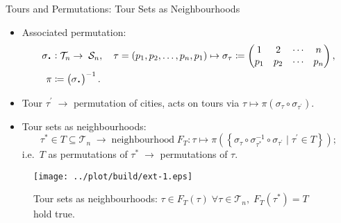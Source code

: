 \documentclass[
  size=8pt,
  style=klope,
  paper=screen,
  mode=present,
  nohandoutpagebreaks,
  pauseslide,
  hlsections,
  fleqn,
]{powerdot}
\newcommand*{\Cdot}{\raisebox{-0.30ex}{\scalebox{1.5}{$\cdot$}}}
\def\eqitspace{\vspace{-5mm}}
\begin{document}
\begin{slide}[toc=Tour Sets as Neighbourhoods]{Tours and Permutations: Tour Sets as Neighbourhoods}
  \begin{itemize}
  \item
  Associated permutation:
  \begin{align}
  \begin{split}
    \sigma_{\Cdot} & :
    \mathcal{T}_n \to \; \mathcal{S}_n, \quad
    \tau = \left(p_1, p_2, \ldots, p_n, p_1 \right)
    \mapsto
  \sigma_\tau \coloneqq
  \begin{pmatrix}
    1 & 2 & \cdots & n \\
    p_1 & p_2 & \cdots &  p_n
  \end{pmatrix},
  \\
  \pi & \coloneqq \left(\sigma_{\Cdot}\right)^{-1}.
  \end{split}
  \end{align}
  \eqitspace%
  \item
  Tour $\tau^\prime \; \rightarrow$ permutation of cities, acts on tours via $\tau \mapsto \pi\left(\sigma_\tau \circ \sigma_{\tau^\prime}\right)$.
  \item
    Tour sets as neighbourhoods:
    \begin{equation}
      \tau^\ast \in T \subseteq \mathcal{T}_n
      \; \rightarrow \;
      \text{neighbourhood} \;
      F_T : \tau \mapsto
      \pi \left(
        \left\{ \sigma_{\tau} \circ \sigma_{\tau^\ast}^{-1} \circ \sigma_{\tau^\prime} \mid \tau^{\prime} \in T\right\}
      \right);
    \end{equation}
    i.e.\ $T$ as permutations of $\tau^\ast \; \rightarrow $ permutations of $\tau$.
  \end{itemize}
  \vspace{-2mm}
  \begin{figure}[H]
    \centering
    \texttt{[image: ../plot/build/ext-1.eps]}
    \caption{%
      Tour sets as neighbourhoods:
      $\tau \in F_T\left(\tau\right) \; \forall \tau \in \mathcal{T}_n, \; F_T\left(\tau^\ast\right) = T$ hold true.
    }
  \end{figure}
\end{slide}
\end{document}
